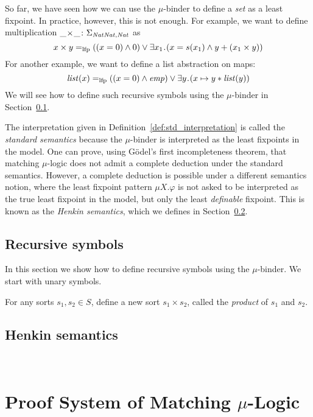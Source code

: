 \documentclass{amsart}
\begin{document}
So far, we have seen how we can use the $\mu$-binder to
define a \emph{set} as a least fixpoint. 
In practice, however, this is not enough. 
For example, we want to define multiplication 
$\_ \! \times \! \_ \colon \Sigma_{\mathit{Nat}\mathit{Nat},\mathit{Nat}}$ as
$$
x \times y =_{\mathrm{lfp}} ((x = 0) \wedge 0) 
\vee \exists x_1 \mathbin{\!.\!} (x = s(x_1) \wedge y + (x_1 \times y))
$$
For another example, we want to define a list abstraction on maps:
$$
\mathit{list}(x) =_{\mathrm{lfp}} ((x = 0) \wedge \mathit{emp}) \vee \exists y \mathbin{\!.\!} (x \mapsto y \mathbin{*} \mathit{list}(y))
$$
We will see how to define such recursive symbols using the $\mu$-binder
in Section~\ref{sec:recursive_symbols}.

The interpretation given in Definition~\ref{def:std_interpretation}
is called the \emph{standard semantics} because the $\mu$-binder
is interpreted as the least fixpoints in the model.
One can prove, using G\"odel's first incompleteness theorem,
that matching $\mu$-logic 
does not admit a complete deduction under the standard semantics.
However, a complete deduction is possible under a different semantics notion,
where the least fixpoint pattern 
$\mu X . \varphi$ 
is not asked to be interpreted as
the true least fixpoint in the model, but only the least \emph{definable} fixpoint.
This is known as the \emph{Henkin semantics}, which we defines in
Section~\ref{sec:hnk_semantics}.

\subsection{Recursive symbols}
\label{sec:recursive_symbols}

In this section we show how to define recursive symbols using the $\mu$-binder.
We start with unary symbols. 

For any sorts $s_1,s_2 \in S$, define a new sort $s_1 \times s_2$,
called the \emph{product} of $s_1$ and $s_2$.

\subsection{Henkin semantics}
\label{sec:hnk_semantics}

\quad\\

\section{Proof System of Matching $\mu$-Logic}


\end{document}
